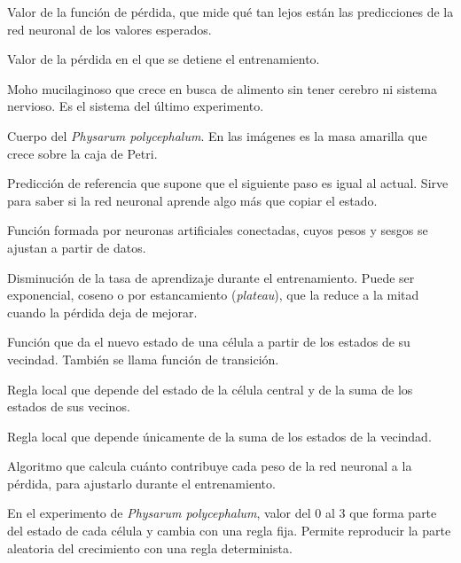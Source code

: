 \begin{description}[leftmargin=1.5em, labelindent=0pt, itemsep=4pt]
	\item[Pérdida] Valor de la función de pérdida, que mide qué tan lejos están las predicciones de la red neuronal de los valores esperados.

	\item[Pérdida objetivo] Valor de la pérdida en el que se detiene el entrenamiento.

	\item[\textit{Physarum polycephalum}] Moho mucilaginoso que crece en busca de alimento sin tener cerebro ni sistema nervioso. Es el sistema del último experimento.

	\item[Plasmodio] Cuerpo del \textit{Physarum polycephalum}. En las imágenes es la masa amarilla que crece sobre la caja de Petri.

	\item[Predicción sin cambio] Predicción de referencia que supone que el siguiente paso es igual al actual. Sirve para saber si la red neuronal aprende algo más que copiar el estado.

	\item[Red neuronal artificial] Función formada por neuronas artificiales conectadas, cuyos pesos y sesgos se ajustan a partir de datos.

	\item[Reducción de la tasa de aprendizaje] Disminución de la tasa de aprendizaje durante el entrenamiento. Puede ser exponencial, coseno o por estancamiento (\textit{plateau}), que la reduce a la mitad cuando la pérdida deja de mejorar.

	\item[Regla local] Función que da el nuevo estado de una célula a partir de los estados de su vecindad. También se llama función de transición.

	\item[Regla semitotalística] Regla local que depende del estado de la célula central y de la suma de los estados de sus vecinos.

	\item[Regla totalística] Regla local que depende únicamente de la suma de los estados de la vecindad.

	\item[Retropropagación] Algoritmo que calcula cuánto contribuye cada peso de la red neuronal a la pérdida, para ajustarlo durante el entrenamiento.

	\item[Ruido] En el experimento de \textit{Physarum polycephalum}, valor del 0 al 3 que forma parte del estado de cada célula y cambia con una regla fija. Permite reproducir la parte aleatoria del crecimiento con una regla determinista.


\end{description}
